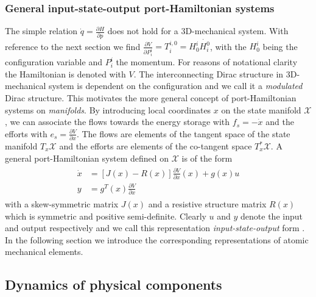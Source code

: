 \documentclass[a4paper,twoside, openright,12pt]{report}
\begin{document}
\subsubsection{General input-state-output port-Hamiltonian systems}
The simple relation $\dot{q}=\frac{\partial H}{\partial p}$ does not hold for a 3D-mechanical system. With reference to the next section we find $\frac{\partial V}{\partial P_i^i} = T_i^{i,0} = H_0^i \dot{H_i^0}$, with the $H_0^i$ being the configuration variable and $P_i^i$ the momentum. For reasons of notational clarity the Hamiltonian is denoted with $V$. The interconnecting Dirac structure in 3D-mechanical system  is dependent on the configuration and we call it a \emph{modulated} Dirac structure. This motivates the more general concept of port-Hamiltonian systems on \emph{manifolds}. By introducing local coordinates $x$ on the state manifold $\mathcal{X}$, we can associate the flows towards the energy storage with $f_s = -\dot{x}$ and the efforts with $e_s = \frac{\partial V}{\partial x}$. The flows are elements of the tangent space of the state manifold $T_x\mathcal{X}$ and the efforts are elements of the co-tangent space $T_x^*\mathcal{X}$. A general port-Hamiltonian system defined on $\mathcal{X}$ is of the form
\begin{eqnarray}
\begin{aligned}
\dot{x} &= [J(x)-R(x)]\frac{\partial V}{\partial x}(x) + g(x) u \\
y &= g^T(x)\frac{\partial V}{\partial x}
\end{aligned}
\end{eqnarray}
with a skew-symmetric matrix $J(x)$ and a resistive structure matrix $R(x)$ which is symmetric and positive semi-definite. Clearly $u$ and $y$ denote the input and output respectively and we call this representation \emph{input-state-output} form \cite{Schaft_14}. In the following section we introduce the corresponding representations of atomic mechanical elements.




\subsection{Dynamics of physical components}\label{SS:DynamicsPhysicalComponents}
\end{document}
